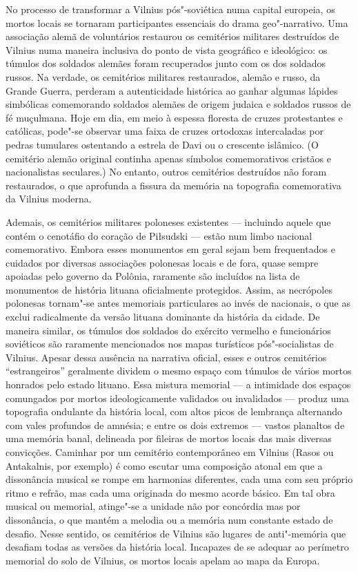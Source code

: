 No processo de transformar a Vilnius pós"-soviética numa capital
europeia, os mortos locais se tornaram participantes essenciais do drama
geo"-narrativo. Uma associação alemã de voluntários restaurou os
cemitérios militares destruídos de Vilnius numa maneira inclusiva do
ponto de vista geográfico e ideológico: os túmulos dos soldados alemães
foram recuperados junto com os dos soldados russos. Na verdade, os
cemitérios militares restaurados, alemão e russo, da Grande Guerra,
perderam a autenticidade histórica ao ganhar algumas lápides simbólicas
comemorando soldados alemães de origem judaica e soldados russos de fé
muçulmana. Hoje em dia, em meio à espessa floresta de cruzes
protestantes e católicas, pode"-se observar uma faixa de cruzes ortodoxas
intercaladas por pedras tumulares ostentando a estrela de Davi ou o
crescente islâmico. (O cemitério alemão original continha apenas
símbolos comemorativos cristãos e nacionalistas seculares.) No entanto,
outros cemitérios destruídos não foram restaurados, o que aprofunda a
fissura da memória na topografia comemorativa da Vilnius moderna.

Ademais, os cemitérios militares poloneses existentes --- incluindo aquele
que contém o cenotáfio do coração de Piłsudski --- estão num limbo
nacional comemorativo. Embora esses monumentos em geral sejam bem
frequentados e cuidados por diversas associações polonesas locais e de
fora, quase sempre apoiadas pelo governo da Polônia, raramente são
incluídos na lista de monumentos de história lituana oficialmente
protegidos. Assim, as necrópoles polonesas tornam"-se antes memoriais
particulares ao invés de nacionais, o que as exclui radicalmente da
versão lituana dominante da história da cidade. De maneira similar, os
túmulos dos soldados do exército vermelho e funcionários soviéticos são
raramente mencionados nos mapas turísticos pós"-socialistas de Vilnius.
Apesar dessa ausência na narrativa oficial, esses e outros cemitérios
``estrangeiros'' geralmente dividem o mesmo espaço com túmulos de vários
mortos honrados pelo estado lituano. Essa mistura memorial --- a
intimidade dos espaços comungados por mortos ideologicamente validados
ou invalidados --- produz uma topografia ondulante da história local, com
altos picos de lembrança alternando com vales profundos de amnésia; e
entre os dois extremos --- vastos planaltos de uma memória banal,
delineada por fileiras de mortos locais das mais diversas convicções.
Caminhar por um cemitério contemporâneo em Vilnius (Rasos ou Antakalnis,
por exemplo) é como escutar uma composição atonal em que a dissonância
musical se rompe em harmonias diferentes, cada uma com seu próprio ritmo
e refrão, mas cada uma originada do mesmo acorde básico. Em tal obra
musical ou memorial, atinge"-se a unidade não por concórdia mas por
dissonância, o que mantém a melodia ou a memória num constante estado de
desafio. Nesse sentido, os cemitérios de Vilnius são lugares de
anti"-memória que desafiam todas as versões da história local. Incapazes
de se adequar ao perímetro memorial do solo de Vilnius, os mortos locais
apelam ao mapa da Europa.

